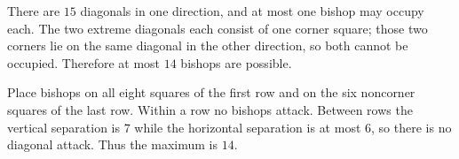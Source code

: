 There are $15$ diagonals in one direction, and at most one bishop may occupy each. The two extreme diagonals each consist of one corner square; those two corners lie on the same diagonal in the other direction, so both cannot be occupied. Therefore at most $14$ bishops are possible.

Place bishops on all eight squares of the first row and on the six noncorner squares of the last row. Within a row no bishops attack. Between rows the vertical separation is $7$ while the horizontal separation is at most $6$, so there is no diagonal attack. Thus the maximum is $\boxed{14}$.
